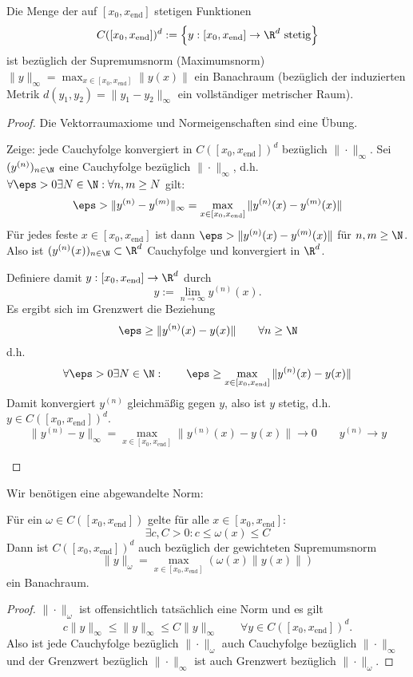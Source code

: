 \documentclass[
]{mycourse}
\begin{document}
\begin{lem} \label{1.7}
	Die Menge der auf $[x_0, x_{\text{end}}]$ stetigen Funktionen
	\[
		C([x_0,x_{\text{end}}])^d := \Big\{ y:[x_0,x_{\text{end}}] \to \R^d \text{ stetig} \Big\}
	\]
	ist bezüglich der Supremumsnorm (Maximumsnorm) $\|y\|_\infty = \max_{x\in [x_0,x_{\text{end}}]} \|y(x)\|$ ein Banachraum (bezüglich der induzierten Metrik $d(y_1,y_2) = \|y_1-y_2\|_\infty$ ein vollständiger metrischer Raum).
	\begin{proof}
		Die Vektorraumaxiome und Normeigenschaften sind eine Übung.

		\begin{seg}[Vollständigkeit]
			Zeige: jede Cauchyfolge konvergiert in $C([x_0,x_{\text{end}}])^d$ bezüglich $\|\cdot\|_\infty$.
			Sei $(y^{(n)})_{n \in \N}$ eine Cauchyfolge bezüglich $\|\cdot\|_\infty$, d.h. $\forall \eps > 0 \exists N \in \N : \forall n,m \ge N$ gilt:
			\[
				\eps > \|y^{(n)} -y^{(m)}\|_\infty = \max_{x\in [x_0,x_{\text{end}}]} \|y^{(n)}(x) - y^{(m)}(x) \|
			\]
			Für jedes feste $x \in [x_0,x_{\text{end}}]$ ist dann $\eps > \| y^{(n)}(x) - y^{(m)}(x)\|$ für $n,m \ge \N$.
			Also ist $(y^{(n)}(x))_{n\in \N} \subset \R^d$ Cauchyfolge und konvergiert in $\R^d$.

			Definiere damit $y : [x_0,x_{\text{end}}] \to \R^d$ durch 
			\[
				y := \lim_{n\to \infty} y^{(n)}(x).
			\]
			Es ergibt sich im Grenzwert die Beziehung
			\[
				\eps \ge \|y^{(n)}(x) - y(x)\|
				\qquad \forall n \ge \N
			\]
			d.h.
			\[
				\forall \eps > 0 \exists N \in \N: \qquad
				\eps \ge \max_{x\in [x_0,x_{\text{end}}]} \|y^{(n)}(x)-y(x)\|
			\]
			Damit konvergiert $y^{(n)}$ gleichmäßig gegen $y$, also ist $y$ stetig, d.h. $y\in C([x_0,x_{\text{end}}])^d$.
			\[
				\|y^{(n)} - y\|_\infty = \max_{x\in [x_0,x_{\text{end}}]} \|y^{(n)}(x) - y(x)\| \to 0
				\qquad y^{(n)} \to y
			\]
		\end{seg}
	\end{proof}
\end{lem}

Wir benötigen eine abgewandelte Norm:

\begin{kor} \label{1.8}
	Für ein $\omega \in C([x_0,x_{\text{end}}])$ gelte für alle $x\in [x_0,x_{\text{end}}]$:
	\[
		\exists c,C > 0 : c \le \omega(x) \le C
	\]
	Dann ist $C([x_0,x_{\text{end}}])^d$ auch bezüglich der gewichteten Supremumsnorm
	\[
		\|y\|_\omega = \max_{x \in [x_0,x_{\text{end}}]}(\omega(x) \|y(x)\|)
	\]
	ein Banachraum.
	
	\begin{proof}
		$\|\cdot\|_\omega$ ist offensichtlich tatsächlich eine Norm und es gilt
		\[
			c \|y\|_\infty \le \|y\|_\infty \le C \|y\|_\infty
			\qquad \forall y\in C([x_0,x_{\text{end}}])^d.
		\]
		Also ist jede Cauchyfolge bezüglich $\|\cdot\|_\omega$ auch Cauchyfolge bezüglich $\|\cdot\|_\infty$ und der Grenzwert bezüglich $\|\cdot\|_\infty$ ist auch Grenzwert bezüglich $\|\cdot\|_\omega$.
	\end{proof}
\end{kor}
\end{document}
